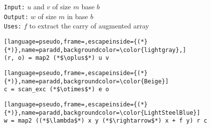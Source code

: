 \begin{figure}
  \centering
  \begin{minipage}{0.47\textwidth}
    \footnotesize
    \texttt{Input:} $u$ and $v$ of size $m$ base $b$\\
    \texttt{Output:} $w$ of size $m$ in base $b$\\
    \texttt{Uses:} $f$ to extract the carry of augmented array
\begin{lstlisting}[language=pseudo,frame=,escapeinside={(*}{*)},name=paradd,backgroundcolor=\color{lightgray},]
(r, o) = map2 (*$\oplus$*) u v
\end{lstlisting}
\vspace{-\baselineskip}
\begin{lstlisting}[language=pseudo,frame=,escapeinside={(*}{*)},name=paradd,backgroundcolor=\color{Beige}]
c = scan_exc (*$\otimes$*) e o
\end{lstlisting}
\vspace{-\baselineskip}
\begin{lstlisting}[language=pseudo,frame=,escapeinside={(*}{*)},name=paradd,backgroundcolor=\color{LightSteelBlue}]
w = map2 ((*$\lambda$*) x y (*$\rightarrow$*) x + f y) r c
\end{lstlisting}
\end{minipage}
  \noindent{}
\end{figure}

